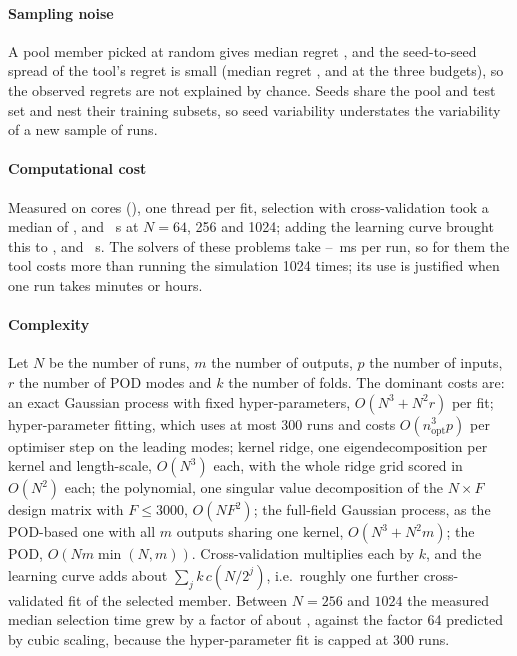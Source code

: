 \paragraph{Sampling noise} A pool member picked at random gives median regret \NullRegret, and the seed-to-seed spread of the tool's regret is small (median regret \SoneMedianSixtyfour, \SoneMedianTwofiftysix{} and \SoneMedianTentwentyfour{} at the three budgets), so the observed regrets are not explained by chance. Seeds share the pool and test set and nest their training subsets, so seed variability understates the variability of a new sample of runs.
\paragraph{Computational cost} Measured on \HwCores{} cores (\HwCpu), one thread per fit, selection with cross-validation took a median of \ToolFitSecSixtyfour{}, \ToolFitSecTwofiftysix{} and \ToolFitSecTentwentyfour{}~s at $N=64$, 256 and 1024; adding the learning curve brought this to \ToolTotalSecSixtyfour{}, \ToolTotalSecTwofiftysix{} and \ToolTotalSecTentwentyfour{}~s. The solvers of these problems take \TpFomLo--\TpFomHi~ms per run, so for them the tool costs more than running the simulation 1024 times; its use is justified when one run takes minutes or hours.
\paragraph{Complexity} Let $N$ be the number of runs, $m$ the number of outputs, $p$ the number of inputs, $r$ the number of POD modes and $k$ the number of folds. The dominant costs are: an exact Gaussian process with fixed hyper-parameters, $O(N^3+N^2 r)$ per fit; hyper-parameter fitting, which uses at most 300 runs and costs $O(n_{\mathrm{opt}}^3 p)$ per optimiser step on the leading modes; kernel ridge, one eigendecomposition per kernel and length-scale, $O(N^3)$ each, with the whole ridge grid scored in $O(N^2)$ each; the polynomial, one singular value decomposition of the $N\times F$ design matrix with $F\le3000$, $O(NF^2)$; the full-field Gaussian process, as the POD-based one with all $m$ outputs sharing one kernel, $O(N^3+N^2m)$; the POD, $O(Nm\min(N,m))$. Cross-validation multiplies each by $k$, and the learning curve adds about $\sum_j k\,c(N/2^j)$, i.e.\ roughly one further cross-validated fit of the selected member. Between $N=256$ and $1024$ the measured median selection time grew by a factor of about \ToolScaleRatio, against the factor 64 predicted by cubic scaling, because the hyper-parameter fit is capped at 300 runs.

